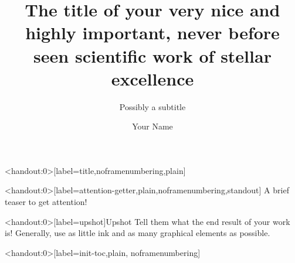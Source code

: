\documentclass[compress, english]{beamer}%
\title{The title of your very nice and highly important, never before seen scientific work of stellar excellence}
\date{\DTMdate{2021-03-12}}
\author{Your Name}
\institute{Your amazing university!}
\subtitle{Possibly a subtitle}
\begin{document}
\begin{frame}<handout:0>[label=title,noframenumbering,plain]
\maketitle
\end{frame}
\begin{frame}<handout:0>[label=attention-getter,plain,noframenumbering,standout]{}
A brief teaser to get attention!
\end{frame}
\begin{frame}<handout:0>[label=upshot]{Upshot}
{\footnotesize Tell them what the end result of your work is! Generally, use as little ink and as many graphical elements as possible.}

\centering
{}%
\hspace{5em}
%

\vspace*{\fill}

%
\end{frame}
\begin{frame}<handout:0>[label=init-toc,plain, noframenumbering]%
\vspace*{\fill}

\tableofcontents[hideallsubsections]

\vspace*{\fill}
\end{frame}
\end{document}
